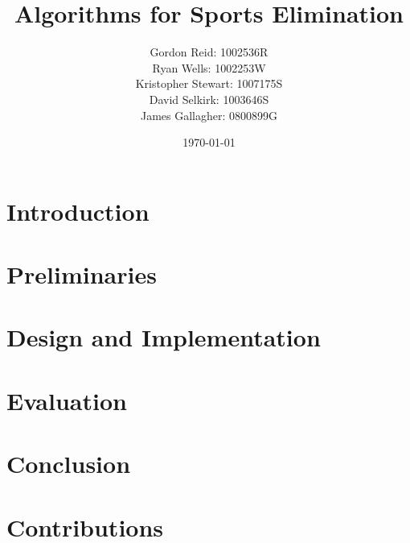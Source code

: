 \documentclass{l3proj}
\begin{document}
\title{Algorithms for Sports Elimination}
\author{
    Gordon Reid: 1002536R\\
    Ryan Wells: 1002253W\\
    Kristopher Stewart: 1007175S\\
    David Selkirk: 1003646S\\
    James Gallagher: 0800899G\\
}\date{\today}
\maketitle
\begin{abstract}

\end{abstract}
\renewcommand{\abstractname}{Acknowledgements}
\begin{abstract}

\end{abstract}
\educationalconsent
\tableofcontents

\chapter{Introduction}


\chapter{Preliminaries}


\chapter{Design and Implementation}


\chapter{Evaluation}



\chapter{Conclusion}


\chapter{Contributions}


\appendix




\end{document}
